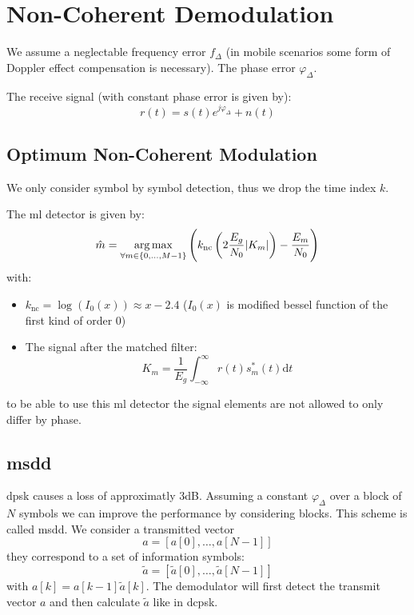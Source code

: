 \section{Non-Coherent Demodulation}
We assume a neglectable frequency error $f_\Delta$ (in mobile scenarios some form of
Doppler effect compensation is necessary). The phase error $\varphi_\Delta$.

The receive signal (with constant phase error is given by):
\begin{equation}
    r(t) = s(t) e^{j \varphi_\Delta} + n(t)
\end{equation}

\subsection{Optimum Non-Coherent Modulation}
We only consider symbol by symbol detection, thus we drop the time index $k$.

The \ac{ml} detector is given by:
\begin{equation}
    \hat{m} = \operatorname*{arg\,max}_{\forall m \in \{0, \ldots, M-1\}} \left(
        k_\text{nc}\left(2 \frac{E_g}{N_0}\abs{K_m}\right) -
        \frac{E_m}{N_0}\right)
\end{equation}
with:
\begin{itemize}
    \item $k_\text{nc} = \log(I_0(x)) \approx x - 2.4$ ($I_0(x)$ is modified
        bessel function of the first kind of order 0)
    \item The signal after the matched filter:
        \begin{equation}
            K_m = \frac{1}{E_g} \int_{-\infty}^\infty r(t) s^*_m (t) \text{d}t
        \end{equation}
\end{itemize}
to be able to use this \ac{ml} detector the signal elements are not allowed to only
differ by phase.

\subsection{\acl{msdd}}
\ac{dpsk} causes a loss of approximatly 3dB. Assuming a constant $\varphi_\Delta$
over a block of $N$ symbols we can improve the performance by considering blocks.
This scheme is called \ac{msdd}. We consider a transmitted vector
\begin{equation}
    a = \left[a[0], \ldots, a[N-1]\right]
\end{equation}
they correspond to a set of information symbols:
\begin{equation}
    \tilde{a} = \left[\tilde{a}[0], \ldots, \tilde{a}[N-1]\right]
\end{equation}
with $a[k] = a[k-1] \tilde{a}[k]$. The demodulator will first detect the transmit
vector $a$ and then calculate $\tilde{a}$ like in \ac{dcpsk}.

